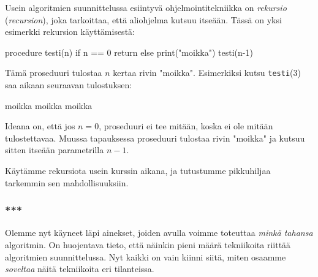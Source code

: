 
Usein algoritmien suunnittelussa esiintyvä ohjelmointitekniikka on
\emph{rekursio} (\emph{recursion}),
joka tarkoittaa, että aliohjelma kutsuu itseään.
Tässä on yksi esimerkki rekursion käyttämisestä:

\begin{code}
procedure testi(n)
    if n == 0
        return
    else
        print("moikka")
        testi(n-1)
\end{code}

Tämä proseduuri tulostaa $n$ kertaa rivin "moikka".
Esimerkiksi kutsu \texttt{testi}(3) saa aikaan seuraavan tulostuksen:

\begin{code}
moikka
moikka
moikka
\end{code}

Ideana on, että jos $n=0$, proseduuri ei tee mitään,
koska ei ole mitään tulostettavaa.
Muussa tapauksessa proseduuri tulostaa rivin "moikka"
ja kutsuu sitten itseään parametrilla $n-1$.

Käytämme rekursiota usein kurssin aikana,
ja tutustumme pikkuhiljaa tarkemmin sen mahdollisuuksiin.

\subsubsection{***}

Olemme nyt käyneet läpi ainekset,
joiden avulla voimme toteuttaa \emph{minkä tahansa} algoritmin.
On huojentava tieto, että näinkin pieni määrä tekniikoita
riittää algoritmien suunnittelussa.
Nyt kaikki on vain kiinni siitä, miten osaamme \emph{soveltaa}
näitä tekniikoita eri tilanteissa.
